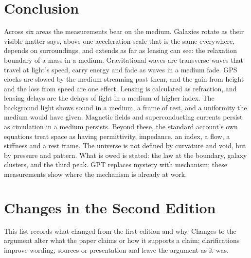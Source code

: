 \section*{Conclusion}

Across six areas the measurements bear on the medium. Galaxies rotate as their visible matter says, above one acceleration scale that is the same everywhere, depends on surroundings, and extends as far as lensing can see: the relaxation boundary of a mass in a medium. Gravitational waves are transverse waves that travel at light's speed, carry energy and fade as waves in a medium fade. GPS clocks are slowed by the medium streaming past them, and the gain from height and the loss from speed are one effect. Lensing is calculated as refraction, and lensing delays are the delays of light in a medium of higher index. The background light shows sound in a medium, a frame of rest, and a uniformity the medium would have given. Magnetic fields and superconducting currents persist as circulation in a medium persists. Beyond these, the standard account's own equations treat space as having permittivity, impedance, an index, a flow, a stiffness and a rest frame. The universe is not defined by curvature and void, but by pressure and pattern. What is owed is stated: the law at the boundary, galaxy clusters, and the third peak. GPT replaces mystery with mechanism; these measurements show where the mechanism is already at work.

\clearpage
\section*{Changes in the Second Edition}

This list records what changed from the first edition and why. Changes to the argument alter what the paper claims or how it supports a claim; clarifications improve wording, sources or presentation and leave the argument as it was.


